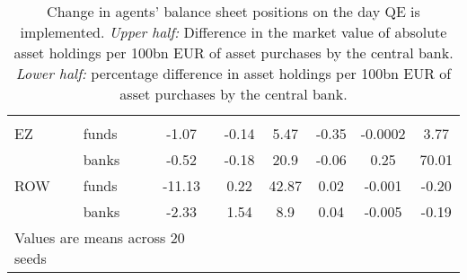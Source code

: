 \begin{table}[htbp]
\begin{tabular}{rlccc|ccc}
	 
	&       &       &       &       &       &       &  \\
		\multicolumn{1}{l}{EZ} & funds & {-1.07} & {-0.14} & {5.47} & {-0.35} & {-0.0002} & {3.77} \\
		& banks & {-0.52} & {-0.18} & {20.9} & {-0.06} & {0.25} & {70.01} \\
		\multicolumn{1}{l}{ROW} & funds & {-11.13} & {0.22} & {42.87} & {0.02} & {-0.001} & {-0.20} \\
		& banks & {-2.33} & {1.54} & {8.9} & {0.04} & {-0.005} & {-0.19} \\
		\bottomrule  
			\multicolumn{3}{l}{ \small  Values are means  across 20 seeds }&
		  	&       &       &       &       &       
	\end{tabular}%
	\label{Tab:sellers}%
	\caption{Change in agents' balance sheet positions on the day QE is implemented. \textit{Upper half:} Difference in the market value of absolute asset holdings per 100bn EUR of asset purchases by the central bank. \textit{Lower half:} percentage difference in asset holdings per 100bn EUR of asset purchases by the central bank.}
\end{table}%